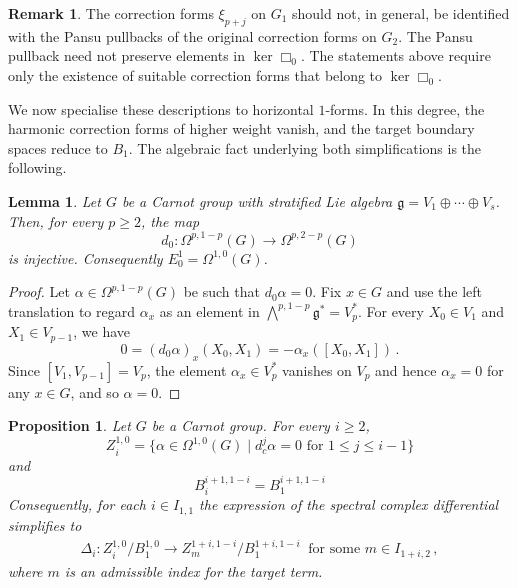 \documentclass[dvipsnames]{amsart}
\newtheorem{lemma}[theorem]{Lemma}
\newtheorem{proposition}[theorem]{Proposition}
\theoremstyle{definition}
\newtheorem{remark}[theorem]{Remark}
\theoremstyle{definition}
\numberwithin{equation}{section}
\begin{document}
\begin{remark}
    The correction forms $\xi_{p+j}$ on $G_1$ should not, in general, be identified with the Pansu pullbacks of the original correction forms on $G_2$. The Pansu pullback need not preserve elements in $\ker\Box_0$. The statements above require only the existence of suitable correction forms that belong to $\ker\Box_0$.
\end{remark}


We now specialise these descriptions to horizontal $1$-forms. In this degree, the harmonic correction forms of higher weight vanish, and the target boundary spaces reduce to $B_1$. The algebraic fact underlying both simplifications is the following.




\begin{lemma}\label{lem:d0-injective-higher-weight-one-forms}
Let $G$ be a Carnot group with stratified Lie algebra $\mathfrak g=V_1\oplus\cdots\oplus V_s$.
Then, for every $p\ge 2$, the map
$$d_0\colon
\Omega^{p,1-p}(G)
\longrightarrow
\Omega^{p,2-p}(G)$$
is injective. Consequently $E_0^1 = \Omega^{1,0}(G)$.
\end{lemma}
\begin{proof}
    Let $\alpha \in \Omega^{p,1-p}(G)$ be such that $d_0 \alpha = 0$. Fix $x \in G$ and use the left translation to regard $\alpha_x$ as an element in $\bigwedge\nolimits^{p,1-p}\mathfrak g^* = V_p^*$. For every $X_0 \in V_1$ and $X_1 \in V_{p-1}$, we have
    \begin{equation*}
        0 = (d_0\alpha)_x(X_0, X_1) = -\alpha_x([X_0,X_1])\,.
    \end{equation*}
    Since $[V_1, V_{p-1}] = V_p$, the element $\alpha_x \in V_p^*$ vanishes on $V_p$ and hence $\alpha_x = 0$ for any $x \in G$, and so $\alpha = 0$.
\end{proof}


\begin{proposition}\label{prop: Bi é B1 per le 2 forme}
    Let $G$ be a Carnot group. For every $i \geq 2$,
    \begin{equation*}
        Z_i^{1,0} = \{\alpha \in \Omega^{1,0}(G) \mid d_c^j\alpha = 0 \text{ for } 1 \leq j \leq i-1\}
    \end{equation*}
    and 
    \begin{equation*}
        B_i^{i+1,1-i} =  B_1^{i+1,1-i} 
    \end{equation*}
Consequently, for each $i\in I_{1,1}$ the expression of the spectral complex differential simplifies to
\begin{align*}
    \Delta_i\colon Z_i^{1,0}/B_1^{1,0}\longrightarrow Z_m^{1+i,1-i}/B_1^{1+i,1-i} \ \text{ for some }m\in I_{1+i,2}\,,
\end{align*}
where $m$ is an admissible index for the target term.
\end{proposition}
\end{document}

